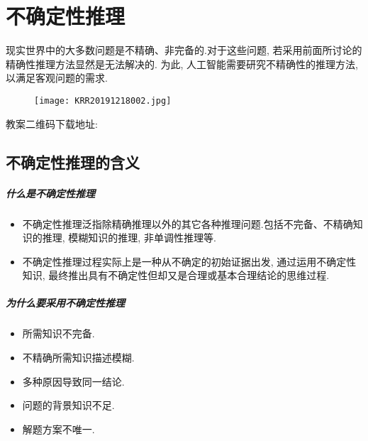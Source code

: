 \chapter{不确定性推理}
\begin{tcolorbox}[colback=white!50,colframe=orange!50,title=不精确性推理方法]
\begin{center}
现实世界中的大多数问题是不精确、非完备的.对于这些问题, 若采用前面所讨论的精确性推理方法显然是无法解决的.
为此, 人工智能需要研究不精确性的推理方法, 以满足客观问题的需求.
\hfill
\end{center}
\end{tcolorbox}
\begin{figure}[H]
\centering
\texttt{[image: KRR20191218002.jpg]}
\label{KRR20191218002}
\end{figure}
教案二维码下载地址: 
\section{不确定性推理的含义}
\paragraph{什么是不确定性推理}
\begin{itemize}
\item 不确定性推理泛指除精确推理以外的其它各种推理问题.包括不完备、不精确知识的推理, 模糊知识的推理, 非单调性推理等.
\item 不确定性推理过程实际上是一种从不确定的初始证据出发, 通过运用不确定性知识, 最终推出具有不确定性但却又是合理或基本合理结论的思维过程.
\end{itemize}
\paragraph{为什么要采用不确定性推理}
\begin{itemize}
\item  所需知识不完备.
\item  不精确所需知识描述模糊.
\item  多种原因导致同一结论.
\item  问题的背景知识不足.
\item  解题方案不唯一.
\end{itemize}

